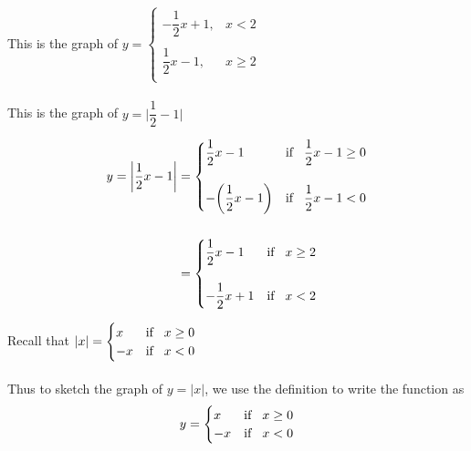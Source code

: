\documentclass[11pt,a4paper]{article}
\begin{document}
This is the graph of $ y=
\begin{cases}
-\dfrac{1}{2}x+1, & x<2\\\\
\dfrac{1}{2}x-1, & x\geq 2\\
\end{cases}
$\\\\

This is the graph of $y=\bigg|\dfrac{1}{2}-1\bigg|$


\begin{align*}
y=\bigg|\dfrac{1}{2}x-1\bigg| & = 
\begin{cases}
\dfrac{1}{2}x-1 & \text{if}\hspace{0.3cm} \dfrac{1}{2}x-1\geq 0\\\\
-\bigg(\dfrac{1}{2}x-1\bigg) & \text{if}\hspace{0.3cm} \dfrac{1}{2}x-1<0\\
\end{cases}\\\\
&=
\begin{cases}
\dfrac{1}{2}x-1 & \text{if}\hspace{0.3cm} x\geq 2\\\\
-\dfrac{1}{2}x+1 & \text{if}\hspace{0.3cm} x<2\\
\end{cases}\\
\end{align*}

Recall that $|x|=
\begin{cases}
x & \text{if}\hspace{0.3cm} x\geq 0\\
-x & \text{if}\hspace{0.3cm} x<0\\
\end{cases}
$\\\\




Thus to sketch the graph of $y=|x|$, we use the definition to write the function as $$y=
\begin{cases}
x & \text{if}\hspace{0.3cm} x\geq 0\\
-x & \text{if}\hspace{0.3cm} x<0\\
\end{cases}
$$
\end{document}
